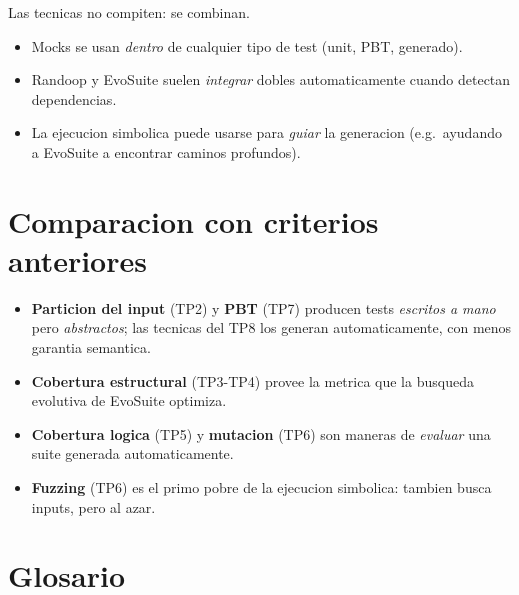 \documentclass[12pt,a4paper]{article}
\begin{document}
\begin{ideabox}
Las tecnicas no compiten: se combinan.
\begin{itemize}
  \item Mocks se usan \emph{dentro} de cualquier tipo de test (unit, PBT, generado).
  \item Randoop y EvoSuite suelen \emph{integrar} dobles automaticamente cuando detectan
  dependencias.
  \item La ejecucion simbolica puede usarse para \emph{guiar} la generacion (e.g.\ ayudando
  a EvoSuite a encontrar caminos profundos).
\end{itemize}
\end{ideabox}

\section{Comparacion con criterios anteriores}

\begin{itemize}
  \item \textbf{Particion del input} (TP2) y \textbf{PBT} (TP7) producen tests
  \emph{escritos a mano} pero \emph{abstractos}; las tecnicas del TP8 los generan
  automaticamente, con menos garantia semantica.
  \item \textbf{Cobertura estructural} (TP3-TP4) provee la metrica que la busqueda
  evolutiva de EvoSuite optimiza.
  \item \textbf{Cobertura logica} (TP5) y \textbf{mutacion} (TP6) son maneras de
  \emph{evaluar} una suite generada automaticamente.
  \item \textbf{Fuzzing} (TP6) es el primo pobre de la ejecucion simbolica: tambien busca
  inputs, pero al azar.
\end{itemize}

\section{Glosario}
\end{document}
